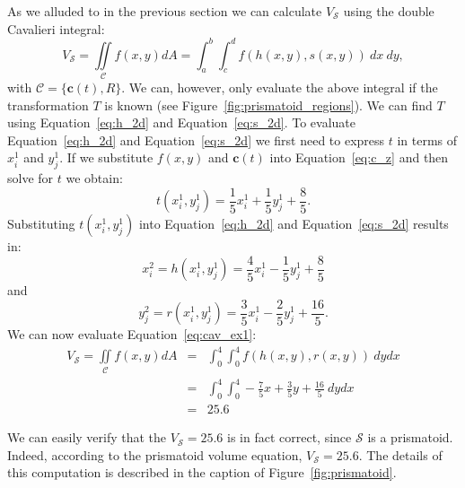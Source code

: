 \documentclass{article}
\theoremstyle{theorem}
\theoremstyle{definition}
\begin{document}
\noindent
As we alluded to in the previous section we can calculate $V_{\mathcal{S}}$ using the double Cavalieri integral:
\begin{equation}
\label{eq:cav_ex1}
V_{\mathcal{S}} = \iint\limits_{\!\mathcal{C}} f(x,y) dA =  \int_a^b\int_c^d f(h(x,y),s(x,y))~dx~dy,
\end{equation}
with $\mathcal{C}=\{\mathbf{c}(t),R\}$. We can, however, only evaluate the above integral if the transformation $T$ is known (see Figure~\ref{fig:prismatoid_regions}). We can find $T$ using Equation~\eqref{eq:h_2d} and 
Equation~\eqref{eq:s_2d}. To evaluate Equation~\eqref{eq:h_2d} and Equation~\eqref{eq:s_2d} we first need to express $t$ in terms of $x_i^1$ and $y_j^1$. If we substitute $f(x,y)$ and $\mathbf{c}(t)$ into Equation~\eqref{eq:c_z} and then solve for $t$ we obtain:
\begin{equation}
t(x_i^1,y_j^1) = \frac{1}{5}x_i^1 + \frac{1}{5}y_j^1 + \frac{8}{5}. 
\end{equation}
Substituting $t(x_i^1,y_j^1)$ into Equation~\eqref{eq:h_2d} and Equation~\eqref{eq:s_2d} results in:
\begin{equation}
x_{i}^2 = h(x_{i}^1,y_{j}^1) = \frac{4}{5} x_{i}^1 - \frac{1}{5} y_{j}^1 + \frac{8}{5}  
\end{equation}
and
\begin{equation}
y_{j}^2 = r(x_{i}^1,y_{j}^1) = \frac{3}{5} x_{i}^1 - \frac{2}{5} y_{j}^1 + \frac{16}{5}.  
\end{equation}
We can now evaluate Equation~\eqref{eq:cav_ex1}:
\begin{eqnarray}
\label{eq:final_int_prismatoid}
V_{\mathcal{S}}=\iint\limits_{\!\mathcal{C}} f(x,y) dA &=& \int_0^4\int_0^4 f(h(x,y),r(x,y))~dydx\\
&=& \int_0^4 \int_0^4 -\frac{7}{5}x + \frac{3}{5} y + \frac{16}{5}~dydx\\
&=& 25.6
\end{eqnarray}

\noindent
We can easily verify that the $V_{\mathcal{S}} = 25.6$ is in fact correct, since $\mathcal{S}$ is a prismatoid. Indeed, according to the prismatoid volume 
equation,  $V_{\mathcal{S}}=25.6$. The details of this computation is described in the caption of Figure~\ref{fig:prismatoid}.
\end{document}

